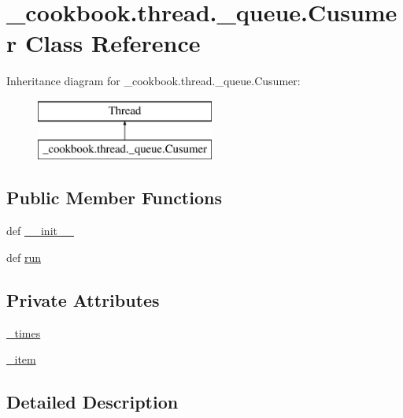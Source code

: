 \hypertarget{class__cookbook_1_1thread_1_1__queue_1_1Cusumer}{\section{\-\_\-cookbook.\-thread.\-\_\-queue.\-Cusumer Class Reference}
\label{class__cookbook_1_1thread_1_1__queue_1_1Cusumer}
}
Inheritance diagram for \-\_\-cookbook.\-thread.\-\_\-queue.\-Cusumer\-:\begin{figure}[H]
\begin{center}
\leavevmode
\includegraphics[height=2.000000cm]{df/dbf/class__cookbook_1_1thread_1_1__queue_1_1Cusumer}
\end{center}
\end{figure}
\subsection*{Public Member Functions}
\begin{DoxyCompactItemize}
\item 
def \hyperlink{class__cookbook_1_1thread_1_1__queue_1_1Cusumer_af05318b010b7ab9ddcf08b41c63f39f0}{\-\_\-\-\_\-init\-\_\-\-\_\-}
\item 
def \hyperlink{class__cookbook_1_1thread_1_1__queue_1_1Cusumer_ab96624a5b06833266094bf94920f9294}{run}
\end{DoxyCompactItemize}
\subsection*{Private Attributes}
\begin{DoxyCompactItemize}
\item 
\hyperlink{class__cookbook_1_1thread_1_1__queue_1_1Cusumer_a5113426d35d2d88365d4c024afdee3a4}{\-\_\-times}
\item 
\hyperlink{class__cookbook_1_1thread_1_1__queue_1_1Cusumer_aab1a86eae9f000baa8ee1e0883de0611}{\-\_\-item}
\end{DoxyCompactItemize}


\subsection{Detailed Description}


